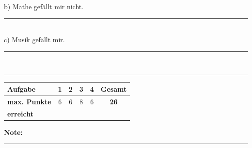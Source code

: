 \documentclass[11pt, a4paper]{article}
\newcommand{\luecke}[1]{\rule{#1}{0.4pt}}
\begin{document}
\noindent
b) Mathe gefällt mir nicht. \\[1.2em]
\luecke{10cm} \\[1em]

\noindent
c) Musik gefällt mir. \\[1.2em]
\luecke{10cm} \\


\vspace{20pt}
\hrule
\vspace{10pt}

\noindent
\begin{tabularx}{\textwidth}{|X|c|c|c|c||c|}
\hline
\textbf{Aufgabe} & 1 & 2 & 3 & 4 & \textbf{Gesamt} \\
\hline
\textbf{max. Punkte} & 6 & 6 & 8 & 6 & \textbf{26} \\
\hline
\textbf{erreicht} & & & & & \\[0.8em]
\hline
\end{tabularx}

\vspace{10pt}

\begin{flushright}
\textbf{Note:} \luecke{2cm}
\end{flushright}
\end{document}
